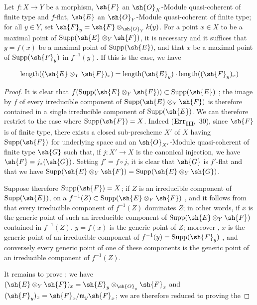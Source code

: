 \begin{proposition}[2.5.5]
\label{IV.2.5.5}
Let $f:X\to Y$ be a morphism, $\sh{F}$ an $\sh{O}_X$-Module quasi-coherent
of finite type and $f$-flat, $\sh{E}$ an $\sh{O}_Y$-Module quasi-coherent of finite type; for all $y\in Y$, set
$\sh{F}_y=\sh{F}\otimes_{\sh{O}_Y}k(y)$. For a point $x\in X$ to be a maximal point of $\operatorname{Supp}(\sh{E}\otimes_Y\sh{F})$, it is necessary and
it suffices that $y=f(x)$ be a maximal point of $\operatorname{Supp}(\sh{E})$, and that $x$ be a maximal point of $\operatorname{Supp}(\sh{F}_y)$
in $f^{-1}(y)$. If this is the case, we have
\end{proposition}

\begin{env}[2.5.5.1]
\label{IV.2.5.5.1}
\[
  \operatorname{length}((\sh{E}\otimes_Y\sh{F})_x) = \operatorname{length}(\sh{E}_y)\cdot\operatorname{length}((\sh{F}_y)_x)
\]
\end{env}

\begin{proof}
It is clear that $f(\operatorname{Supp}(\sh{E}\otimes_Y\sh{F}))\subset\operatorname{Supp}(\sh{E})$ ; the image by $f$ of every
irreducible component of $\operatorname{Supp}(\sh{E}\otimes_Y\sh{F})$ is therefore contained in a single irreducible
component of $\operatorname{Supp}(\sh{E})$. We can therefore restrict to the case where $\operatorname{Supp}(\sh{F})=X$. Indeed
(\textbf{Err}\textsubscript{\textbf{III}},~30), since $\sh{F}$ is of finite type, there exists a closed sub-prescheme $X'$ of $X$
having $\operatorname{Supp}(\sh{F})$ for underlying space and an $\sh{O}_{X'}$-Module quasi-coherent of finite type
$\sh{G}$ such that, if $j:X'\to X$ is the canonical injection, we have $\sh{F}=j_*(\sh{G})$. Setting
$f'=f\circ j$, it is clear that $\sh{G}$ is $f'$-flat and that we have $\operatorname{Supp}(\sh{E}\otimes_Y\sh{F})=\operatorname{Supp}(\sh{E}\otimes_Y\sh{G})$.

Suppose therefore $\operatorname{Supp}(\sh{F})=X$; if $Z$ is an irreducible component of $\operatorname{Supp}(\sh{E})$,
on a $f^{-1}(Z)\subset\operatorname{Supp}(\sh{E}\otimes_Y\sh{F})$ , and it follows from  that every irreducible
component of $f^{-1}(Z)$ dominates $Z$; in other words, if $x$ is the generic point of such an irreducible
component of $\operatorname{Supp}(\sh{E}\otimes_Y\sh{F})$ contained in $f^{-1}(Z)$, $y=f(x)$ is the generic
point of $Z$; moreover , $x$ is the generic point of an irreducible
component of $f^{-1}(y)=\operatorname{Supp}(\sh{F}_y)$ , and conversely every generic
point of one of these components is the generic point of an irreducible component of $f^{-1}(Z)$.


It remains to prove ; we have $(\sh{E}\otimes_Y\sh{F})_x=\sh{E}_y\otimes_{\sh{O}_y}\sh{F}_x$  and
$(\sh{F}_y)_x=\sh{F}_x/\mathfrak{m}_y\sh{F}_x$; we are therefore reduced to proving the
\end{proof}

